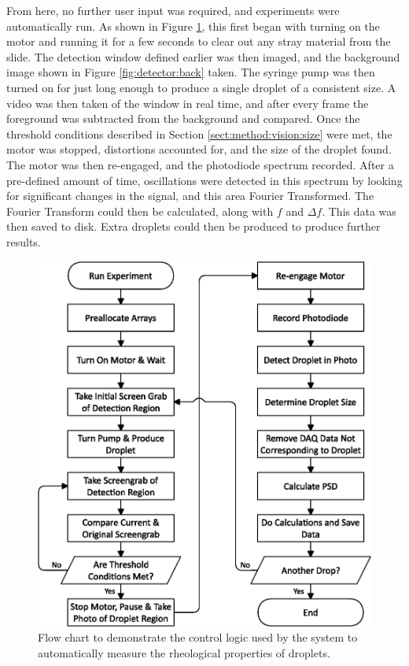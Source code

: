 \documentclass{physics_article_B}
\begin{document}
        From here, no further user input was required, and experiments were automatically run. As shown in Figure \ref{fig:setup:logic}, this first began with turning on the motor and running it for a few seconds to clear out any stray material from the slide. The detection window defined earlier was then imaged, and the background image shown in Figure \ref{fig:detector:back} taken. The syringe pump was then turned on for just long enough to produce a single droplet of a consistent size. A video was then taken of the window in real time, and after every frame the foreground was subtracted from the background and compared. Once the threshold conditions described in Section \ref{sect:method:vision:size} were met, the motor was stopped, distortions accounted for, and the size of the droplet found. The motor was then re-engaged, and the photodiode spectrum recorded. After a pre-defined amount of time, oscillations were detected in this spectrum by looking for significant changes in the signal, and this area Fourier Transformed. The Fourier Transform could then be calculated, along with $f$ and $\Delta f$. This data was then saved to disk. Extra droplets could then be produced to produce further results.
    
        \begin{figure}[H]
            \centering
            \hspace*{-1cm}\includegraphics[scale=0.8]{Figures/FlowLogic.eps}
            \caption{Flow chart to demonstrate the control logic used by the system to automatically measure the rheological properties of droplets.}
            \label{fig:setup:logic}
        \end{figure}
\end{document}
